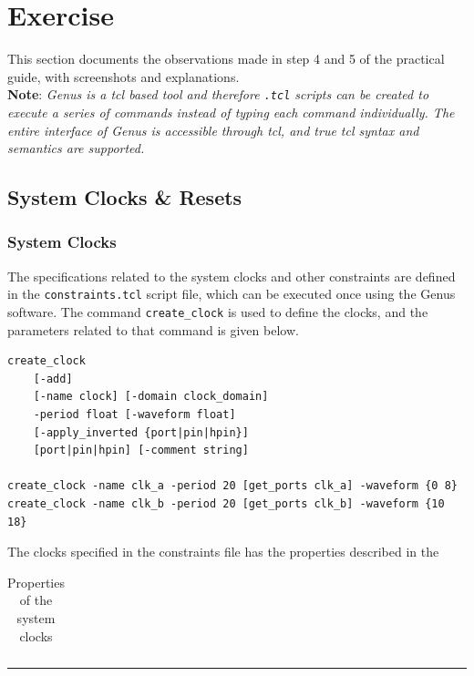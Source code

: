 \documentclass[a4paper,11pt]{article}%
\begin{document}
\pagebreak
\section{Exercise}
This section documents the observations made in step 4 and 5 of the practical guide, with screenshots and explanations.\\

\textbf{Note}: \textit{Genus is a \ac{tcl} based tool and therefore {\tt .tcl} scripts can be created to execute a series of commands instead of typing each command individually. The entire interface of Genus is accessible through \ac{tcl}, and true \ac{tcl} syntax and semantics are supported.}

\subsection{System Clocks \& Resets}

\subsubsection{System Clocks}

The specifications related to the system clocks and other constraints are defined in the {\tt constraints.tcl} script file, which can be executed once using the Genus software. The command {\tt create\_clock} is used to define the clocks, and the parameters related to that command is given below\cite{genus_command_ref_2019}.

\begin{verbatim}
create_clock
    [-add]
    [-name clock] [-domain clock_domain]
    -period float [-waveform float]
    [-apply_inverted {port|pin|hpin}]
    [port|pin|hpin] [-comment string]

create_clock -name clk_a -period 20 [get_ports clk_a] -waveform {0 8}
create_clock -name clk_b -period 20 [get_ports clk_b] -waveform {10 18}
\end{verbatim}

The clocks specified in the constraints file has the properties described in the 

\begin{table}[h]
	\centering
	\caption{Properties of the system clocks}
	\begin{tabular}{|L{0.15\linewidth}  |C{0.12\linewidth}  | C{0.12\linewidth} |  C{0.12\linewidth} |  C{0.12\linewidth} | C{0.12\linewidth} | }
		
	
	\end{tabular}
	\label{table:}
\end{table}

\vfill
\hrule
\vspace{0.5cm}



\end{document}
